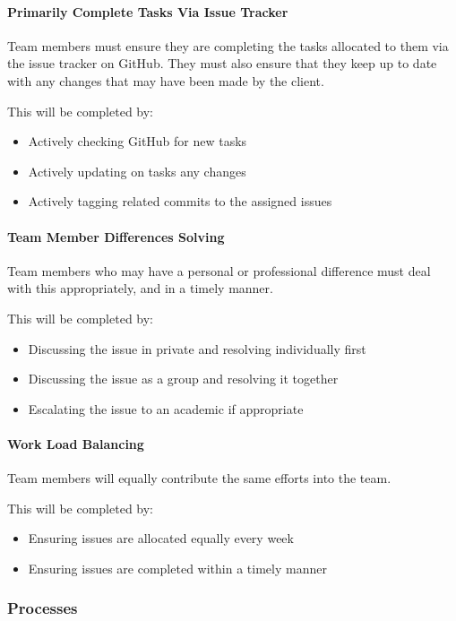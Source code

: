 \documentclass[12pt, a4paper, onecolumn]{article}
\begin{document}
\paragraph{Primarily Complete Tasks Via Issue Tracker}
Team members must ensure they are completing the tasks allocated to them
via the issue tracker on GitHub. They must also ensure that they keep
up to date with any changes that may have been made by the client.

This will be completed by:
\begin{itemize}
  \setlength\itemsep{1px}
  \item Actively checking GitHub for new tasks
  \item Actively updating on tasks any changes
  \item Actively tagging related commits to the assigned issues
\end{itemize}

\paragraph{Team Member Differences Solving}
Team members who may have a personal or professional difference must
deal with this appropriately, and in a timely manner.

This will be completed by:
\begin{itemize}
  \setlength\itemsep{1px}
  \item Discussing the issue in private and resolving individually first
  \item Discussing the issue as a group and resolving it together
  \item Escalating the issue to an academic if appropriate
\end{itemize}

\paragraph{Work Load Balancing}
Team members will equally contribute the same efforts into the team.

This will be completed by:
\begin{itemize}
  \setlength\itemsep{1px}
  \item Ensuring issues are allocated equally every week
  \item Ensuring issues are completed within a timely manner
\end{itemize}

\subsubsection{Processes}
\end{document}
